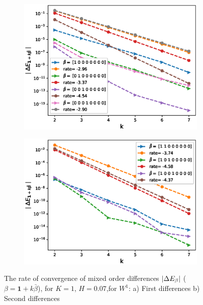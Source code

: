 \documentclass[11pt]{article}
\begin{document}
\begin{figure}[h!]
	\centering
	
	\begin{subfigure}{.4\textwidth}
		\centering
		\includegraphics[width=1\linewidth]{./figures/rBergomi_mixed_error_rates/with_linear_hierarchy/N_4/H_007/first_difference_rbergomi_4steps_H_007_K_1_totally_hierarch_with_rate_W1}
		\caption{}
		\label{fig:sub3}
	\end{subfigure}%
	\begin{subfigure}{.4\textwidth}
		\centering
		\includegraphics[width=1\linewidth]{./figures/rBergomi_mixed_error_rates/with_linear_hierarchy/N_4/H_007/mixed_difference_order2_rbergomi_4steps_H_007_K_1_totally_hierarch_with_rate_W1}
		\caption{}
		\label{fig:sub3}
	\end{subfigure}%
	
	
	\caption{The rate of convergence of  mixed order differences $\left\lvert\Delta E_{\beta}\right\rvert$ ($\beta=\mathbf{1}+k \bar{\beta}$), for $K=1$, $H=0.07$,for $W^1$: a) First differences  b) Second differences }
	\label{fig:mixed_diff_comp_K_1_H_007_wihtout_change_measure,linear}
\end{figure}
\end{document}
